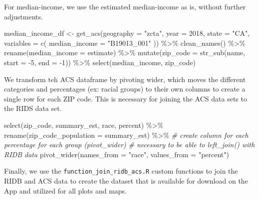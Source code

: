 \documentclass[
  11 pt,
  openany]{book}
\newenvironment{Shaded}{\begin{snugshade}}{\end{snugshade}}
\newcommand{\AttributeTok}[1]{\textcolor[rgb]{0.77,0.63,0.00}{#1}}
\newcommand{\CommentTok}[1]{\textcolor[rgb]{0.56,0.35,0.01}{\textit{#1}}}
\newcommand{\DecValTok}[1]{\textcolor[rgb]{0.00,0.00,0.81}{#1}}
\newcommand{\FunctionTok}[1]{\textcolor[rgb]{0.00,0.00,0.00}{#1}}
\newcommand{\NormalTok}[1]{#1}
\newcommand{\OtherTok}[1]{\textcolor[rgb]{0.56,0.35,0.01}{#1}}
\newcommand{\SpecialCharTok}[1]{\textcolor[rgb]{0.00,0.00,0.00}{#1}}
\newcommand{\StringTok}[1]{\textcolor[rgb]{0.31,0.60,0.02}{#1}}
\begin{document}
For median-income, we use the estimated median-income as is, without further adjustments.

\begin{Shaded}
\begin{Highlighting}[]
\NormalTok{median\_income\_df }\OtherTok{\textless{}{-}} 
  \FunctionTok{get\_acs}\NormalTok{(}\AttributeTok{geography =} \StringTok{"zcta"}\NormalTok{, }\AttributeTok{year =} \DecValTok{2018}\NormalTok{,}
          \AttributeTok{state =} \StringTok{"CA"}\NormalTok{,}
          \AttributeTok{variables =} \FunctionTok{c}\NormalTok{(}
            \AttributeTok{median\_income =} \StringTok{"B19013\_001"} 
\NormalTok{          )) }\SpecialCharTok{\%\textgreater{}\%} 
  \FunctionTok{clean\_names}\NormalTok{() }\SpecialCharTok{\%\textgreater{}\%} 
  \FunctionTok{rename}\NormalTok{(}\AttributeTok{median\_income =}\NormalTok{ estimate) }\SpecialCharTok{\%\textgreater{}\%} 
  \FunctionTok{mutate}\NormalTok{(}\AttributeTok{zip\_code =} \FunctionTok{str\_sub}\NormalTok{(name, }\AttributeTok{start =} \SpecialCharTok{{-}}\DecValTok{5}\NormalTok{, }\AttributeTok{end =} \SpecialCharTok{{-}}\DecValTok{1}\NormalTok{)) }\SpecialCharTok{\%\textgreater{}\%} 
  \FunctionTok{select}\NormalTok{(median\_income, zip\_code)}
\end{Highlighting}
\end{Shaded}

We transform teh ACS dataframe by pivoting wider, which moves the different categories and percentages (ex: racial groups) to their own columns to create a single row for each ZIP code. This is necessary for joining the ACS data sets to the RIDS data set.

\begin{Shaded}
\begin{Highlighting}[]
\FunctionTok{select}\NormalTok{(zip\_code, summary\_est, race, percent) }\SpecialCharTok{\%\textgreater{}\%} 
  \FunctionTok{rename}\NormalTok{(}\AttributeTok{zip\_code\_population =}\NormalTok{ summary\_est) }\SpecialCharTok{\%\textgreater{}\%} 
  \CommentTok{\# create column for each percentage for each group (pivot\_wider)}
  \CommentTok{\# necessary to be able to left\_join() with RIDB data}
  \FunctionTok{pivot\_wider}\NormalTok{(}\AttributeTok{names\_from =} \StringTok{"race"}\NormalTok{,}
              \AttributeTok{values\_from =} \StringTok{"percent"}\NormalTok{)}
\end{Highlighting}
\end{Shaded}

Finally, we use the \texttt{function\_join\_ridb\_acs.R} custom functions to join the RIDB and ACS data to create the dataset that is available for download on the App and utilized for all plots and maps.
\end{document}
